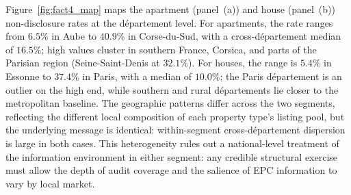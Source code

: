 Figure~\ref{fig:fact4_map} maps the apartment (panel~(a)) and house (panel~(b)) non-disclosure rates at the d\'epartement level. For apartments, the rate ranges from $6.5\%$ in Aube to $40.9\%$ in Corse-du-Sud, with a cross-d\'epartement median of $16.5\%$; high values cluster in southern France, Corsica, and parts of the Parisian region (Seine-Saint-Denis at $32.1\%$). For houses, the range is $5.4\%$ in Essonne to $37.4\%$ in Paris, with a median of $10.0\%$; the Paris d\'epartement is an outlier on the high end, while southern and rural d\'epartements lie closer to the metropolitan baseline. The geographic patterns differ across the two segments, reflecting the different local composition of each property type's listing pool, but the underlying message is identical: within-segment cross-d\'epartement dispersion is large in both cases. This heterogeneity rules out a national-level treatment of the information environment in either segment: any credible structural exercise must allow the depth of audit coverage and the salience of EPC information to vary by local market.
